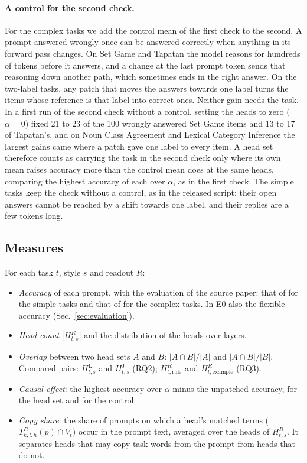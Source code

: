 \documentclass[11pt,a4paper]{article}
\begin{document}
\paragraph{A control for the second check.} For the complex tasks we add the control mean of the first check to the second. A prompt answered wrongly once can be answered correctly when anything in its forward pass changes. On Set Game and Tapatan the model reasons for hundreds of tokens before it answers, and a change at the last prompt token sends that reasoning down another path, which sometimes ends in the right answer. On the two-label tasks, any patch that moves the answers towards one label turns the items whose reference is that label into correct ones. Neither gain needs the task. In a first run of the second check without a control, setting the heads to zero ($\alpha=0$) fixed 21 to 23 of the 100 wrongly answered Set Game items and 13 to 17 of Tapatan's, and on Noun Class Agreement and Lexical Category Inference the largest gains came where a patch gave one label to every item. A head set therefore counts as carrying the task in the second check only where its own mean raises accuracy more than the control mean does at the same heads, comparing the highest accuracy of each over $\alpha$, as in the first check. The simple tasks keep the check without a control, as in the released script: their open answers cannot be reached by a shift towards one label, and their replies are a few tokens long.

\subsection{Measures}\label{sec:measures}
For each task $t$, style $s$ and readout $R$:
\begin{itemize}
\item \emph{Accuracy} of each prompt, with the evaluation of the source paper: that of \citet{yang2026shared} for the simple tasks and that of \citet{fu2026rules} for the complex tasks. In E0 also the flexible accuracy (Sec.~\ref{sec:evaluation}).
\item \emph{Head count} $|H^{R}_{t,s}|$ and the distribution of the heads over layers.
\item \emph{Overlap} between two head sets $A$ and $B$: $|A\cap B|/|A|$ and $|A\cap B|/|B|$. Compared pairs: $H^{\mathrm{L}}_{t,s}$ and $H^{\mathrm{J}}_{t,s}$ (RQ2); $H^{R}_{t,\text{rule}}$ and $H^{R}_{t,\text{example}}$ (RQ3).
\item \emph{Causal effect}: the highest accuracy over $\alpha$ minus the unpatched accuracy, for the head set and for the control.
\item \emph{Copy share}: the share of prompts on which a head's matched terms ($T^{R}_{k,l,h}(p)\cap V_t$) occur in the prompt text, averaged over the heads of $H^{R}_{t,s}$. It separates heads that may copy task words from the prompt from heads that do not.
\end{itemize}
\end{document}
